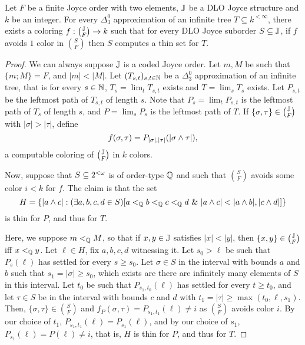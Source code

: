 \begin{theorem}\label{th:dt-implies-rwkl''}
  Let $F$ be a finite Joyce order with two elements, $\mathbb{J}$ be a DLO Joyce structure and $k$ be an integer.
  For every $\Delta^0_3$ approximation of an infinite tree $T\subseteq k^{<\infty}$, there exists a coloring
  $f:{\mathbb{J} \choose F}\to k$ such that for every DLO Joyce suborder $S\subseteq \mathbb{J}$, if $f$ avoids $1$ color in ${S\choose F}$ then $S$ computes a thin set for $T$.
\end{theorem}
\begin{proof}
  \newcommand{\femb}{f_{<_\Qb}}
  We can always suppose $\mathbb{J}$ is a coded Joyce order. Let $m,M$ be such that $\{m;M\}=F$, and $|m|<|M|$.
  Let $(T_{s,t})_{s,t\in\mathbb{N}}$ be a $\Delta^0_3$ approximation of an infinite
  tree, that is for every $s\in\mathbb{N}$, $T_s=\lim_t T_{s,t}$ exists and $T=\lim_s
  T_s$ exists. Let $P_{s,t}$ be the
  leftmost path of $T_{s,t}$ of length $s$. Note that $P_s=\lim_tP_{s,t}$ is the
  leftmost path of $T_s$ of length $s$, and $P=\lim_s P_s$ is the leftmost path
  of $T$. If $\{\sigma,\tau\}\in {\mathbb{J}\choose F}$ with $|\sigma|>|\tau|$, define \[f(\sigma, \tau)=P_{|\sigma|,|\tau|}(|\sigma\wedge\tau|),\] 
  a computable coloring of $\mathbb{J}\choose F$ in $k$ colors.

  Now, suppose that $S\subseteq{2^{<\omega}}$ is of order-type $\mathbb{Q}$ and such that $S\choose F$ avoids some color $i<k$ for $f$.
   The claim is that the set \[H=\{|a\meet c|:(\exists a,b,c,d\in S)[a\ltlex
   b\ltlex c\ltlex d\land |a\meet c|<|a\meet b|,|c\meet d|]\}\] is thin for
  $P$, and thus for $T$.

  Here, we suppose $m<_{\mathbb{Q}} M$, so that if $x,y\in\mathbb{J}$ satisfies $|x|<|y|$, then $\{x,y\}\in{\mathbb{J}\choose F}$ iff $x<_{\mathbb{Q}} y$.
  Let $\ell\in H$, fix $a,b,c,d$ witnessing it. %
  Let $s_0>\ell$ be such that $P_{s}(\ell)$ has settled for every
  $s\geq s_0$. Let $\sigma\in S$ in the interval with bounds $a$ and $b$ such
  that $s_1=|\sigma|\geq s_0$, which exists are there are infinitely many
  elements of $S$ in this interval.
  Let $t_0$ be such
  that $P_{s_1,t_0}(\ell)$ has settled for every $t\geq t_0$, and let $\tau\in
  S$ be in the interval with bounds $c$ and $d$ with $t_1=|\tau|\geq
  \max(t_0,\ell, s_1)$.
  Then, $\{\sigma,\tau\}\in{S\choose F}$ and
  $f_P(\sigma,\tau)=P_{s_1,t_1}(\ell)\neq i$ as $S\choose F$ avoids color $i$. By our choice of $t_1$,
  $P_{s_1,t_1}(\ell)=P_{s_1}(\ell)$, and by our choice of $s_1$,
  $P_{s_1}(\ell)=P(\ell)\neq i$, that is, $H$ is thin for $P$, and thus for $T$.


\end{proof}
